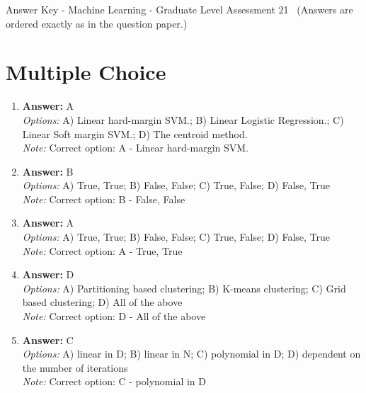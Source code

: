 \documentclass[12pt]{article}
\begin{document}
\begin{center}
Answer Key - Machine Learning - Graduate Level Assessment 21 \
\small (Answers are ordered exactly as in the question paper.)
\end{center}

\section*{Multiple Choice}
\begin{enumerate}[label=\arabic*.]
\item \textbf{Answer:} A
\\ \textit{Options:} A) Linear hard-margin SVM.; B) Linear Logistic Regression.; C) Linear Soft margin SVM.; D) The centroid method.
\\ \textit{Note:} Correct option: A - Linear hard-margin SVM.
\item \textbf{Answer:} B
\\ \textit{Options:} A) True, True; B) False, False; C) True, False; D) False, True
\\ \textit{Note:} Correct option: B - False, False
\item \textbf{Answer:} A
\\ \textit{Options:} A) True, True; B) False, False; C) True, False; D) False, True
\\ \textit{Note:} Correct option: A - True, True
\item \textbf{Answer:} D
\\ \textit{Options:} A) Partitioning based clustering; B) K-means clustering; C) Grid based clustering; D) All of the above
\\ \textit{Note:} Correct option: D - All of the above
\item \textbf{Answer:} C
\\ \textit{Options:} A) linear in D; B) linear in N; C) polynomial in D; D) dependent on the number of iterations
\\ \textit{Note:} Correct option: C - polynomial in D
\end{enumerate}
\end{document}
